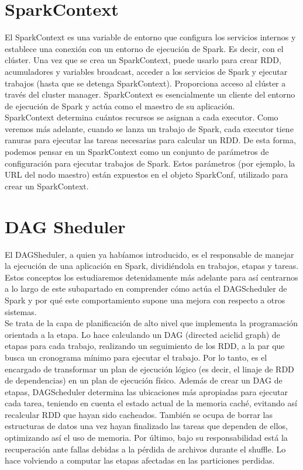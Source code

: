  
\section{SparkContext}
 
El SparkContext es una variable de entorno que configura los servicios internos y establece una conexión con un entorno de ejecución de Spark. Es decir, con el clúster.
Una vez que se crea un SparkContext, puede usarlo para crear RDD, acumuladores y variables broadcast, acceder a los servicios de Spark y ejecutar trabajos (hasta que se detenga SparkContext). Proporciona acceso al clúster a través del cluster manager.
SparkContext es esencialmente un cliente del entorno de ejecución de Spark y actúa como el maestro de su aplicación.\\

SparkContext determina cuántos recursos se asignan a cada executor. Como veremos más adelante, cuando se lanza un trabajo de Spark, cada executor tiene ranuras para ejecutar las tareas necesarias para calcular un RDD. De esta forma, podemos pensar en un SparkContext como un conjunto de parámetros de configuración para ejecutar trabajos de Spark. Estos parámetros (por ejemplo, la URL del nodo maestro) están expuestos en el objeto SparkConf, utilizado para crear un SparkContext.\\
 
\section{DAG Sheduler}
 
El DAGSheduler, a quien ya habíamos introducido, es el responsable de manejar la ejecución de una aplicación en Spark, dividiéndola en trabajos, etapas y tareas. Estos conceptos los estudiaremos detenidamente más adelante para así centrarnos a lo largo de este subapartado en comprender cómo actúa el DAGScheduler de Spark y por qué este comportamiento supone una mejora con respecto a otros sistemas.\\

Se trata de la capa de planificación de alto nivel \cite{05GitDAG} que implementa la programación orientada a la etapa. Lo hace calculando un DAG (directed aciclid graph) de etapas para cada trabajo, realizando un seguimiento de los RDD, a la par que busca un cronograma mínimo para ejecutar el trabajo. Por lo tanto, es el encargado de transformar un plan de ejecución lógico (es decir, el linaje de RDD de dependencias) en un plan de ejecución físico. Además de crear un DAG de etapas, DAGScheduler determina las ubicaciones más apropiadas para ejecutar cada tarea, teniendo en cuenta el estado actual de la memoria caché, evitando así recalcular RDD que hayan sido cacheados. También se ocupa de borrar las estructuras de datos una vez hayan finalizado las tareas que dependen de ellos, optimizando así el uso de memoria. Por último, bajo su responsabilidad está la recuperación ante fallas debidas a la pérdida de archivos durante el shuffle. Lo hace volviendo a computar las etapas afectadas en las particiones perdidas.\\

